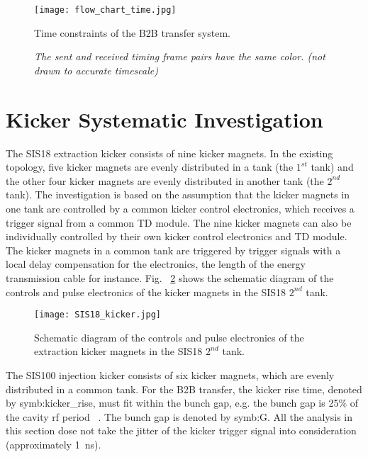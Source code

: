 \begin{landscape}
\begin{figure}[!htb]
   \centering   
   \texttt{[image: flow\_chart\_time.jpg]}
   \caption{Time constraints of the B2B transfer system.}
   \caption*{\textsl{\small{The sent and received timing frame pairs have the same color. (not drawn to accurate timescale) }}}
   \label{time_constraint}
\end{figure}
\end{landscape}

\section{Kicker Systematic Investigation}
\label{real_kicker}
The SIS18 extraction kicker consists of nine kicker magnets. In the existing topology, five kicker magnets are evenly distributed in a tank (the $1^{st}$ tank) and the other four kicker magnets are evenly distributed in another tank (the $2^{nd}$ tank). The investigation is based on the assumption that the kicker magnets in one tank are controlled by a common kicker control electronics, which receives a trigger signal from a common TD module. The nine kicker magnets can also be individually controlled by their own kicker control electronics and TD module. The kicker magnets in a common tank are triggered by trigger signals with a local delay compensation for the electronics, the length of the energy transmission cable for instance. Fig. ~\ref{SIS18_kicker} shows the schematic diagram of the controls and pulse electronics of the kicker magnets in the SIS18 $2^{nd}$ tank. 
\begin{figure}[H]
   \centering   
   \texttt{[image: SIS18\_kicker.jpg]}
   \caption{Schematic diagram of the controls and pulse electronics of the extraction kicker magnets in the SIS18 $2^{nd}$ tank.}
   \label{SIS18_kicker}
\end{figure}

The SIS100 injection kicker consists of six kicker magnets, which are evenly distributed in a common tank. For the B2B transfer, the kicker rise time, denoted by \gls{symb:kicker_rise}, must fit within the bunch gap, e.g. the bunch gap is 25$\%$ of the cavity rf period ~\cite{blell_injection_2014, liebermann_sis100_2013}. The bunch gap is denoted by \gls{symb:G}.  All the analysis in this section dose not take the jitter of the kicker trigger signal into consideration (approximately \SI{1}{ns}). 


